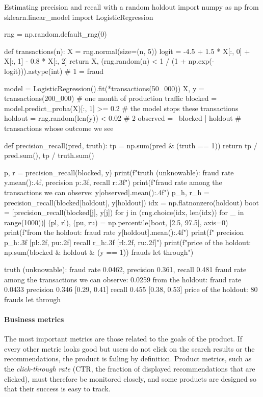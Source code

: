 \begin{pylisting}[label={lst:holdout}]{Estimating precision and recall with a random holdout}
import numpy as np
from sklearn.linear_model import LogisticRegression

rng = np.random.default_rng(0)

def transactions(n):
    X = rng.normal(size=(n, 5))
    logit = -4.5 + 1.5 * X[:, 0] + X[:, 1] - 0.8 * X[:, 2]
    return X, (rng.random(n) < 1 / (1 + np.exp(-logit))).astype(int)   # 1 = fraud

model = LogisticRegression().fit(*transactions(50_000))
X, y = transactions(200_000)                       # one month of production traffic
blocked = model.predict_proba(X)[:, 1] >= 0.2      # the model stops these transactions
holdout = rng.random(len(y)) < 0.02                # 2%
observed = ~blocked | holdout                      # transactions whose outcome we see

def precision_recall(pred, truth):
    tp = np.sum(pred & (truth == 1))
    return tp / pred.sum(), tp / truth.sum()

p, r = precision_recall(blocked, y)
print(f"truth (unknowable): fraud rate {y.mean():.4f}, precision {p:.3f}, recall {r:.3f}")
print(f"fraud rate among the transactions we can observe: {y[observed].mean():.4f}")
p_h, r_h = precision_recall(blocked[holdout], y[holdout])
idx = np.flatnonzero(holdout)
boot = [precision_recall(blocked[j], y[j]) for j in
        (rng.choice(idx, len(idx)) for _ in range(1000))]
(pl, rl), (pu, ru) = np.percentile(boot, [2.5, 97.5], axis=0)
print(f"from the holdout: fraud rate {y[holdout].mean():.4f}")
print(f"  precision {p_h:.3f} [{pl:.2f}, {pu:.2f}] recall {r_h:.3f} [{rl:.2f}, {ru:.2f}]")
print(f"price of the holdout: {np.sum(blocked & holdout & (y == 1))} frauds let through")
\end{pylisting}
\begin{pyoutput}
truth (unknowable): fraud rate 0.0462, precision 0.361, recall 0.481
fraud rate among the transactions we can observe: 0.0259
from the holdout: fraud rate 0.0433
  precision 0.346 [0.29, 0.41] recall 0.455 [0.38, 0.53]
price of the holdout: 80 frauds let through
\end{pyoutput}

\paragraph{Business metrics} The most important metrics are those related to the goals of the product. If
every other metric looks good but users do not click on the search results or the recommendations, the
product is failing by definition. Product metrics, such as the \emph{click-through rate} (CTR, the fraction
of displayed recommendations that are clicked), must therefore be monitored closely, and some products are
designed so that their success is easy to track.


